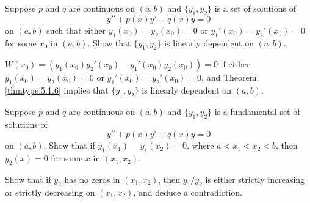 \documentclass{ximera}
\begin{document}
\begin{problem}\label{exer:5.1.30}
Suppose  $p$ and $q$ are continuous  on  $(a,b)$ and
$\{y_1,y_2\}$ is a  set of solutions of
$$
y''+p(x)y'+q(x)y=0
$$
on $(a,b)$ such that either $y_1(x_0)=y_2(x_0)=0$ or
$y_1'(x_0)=y_2'(x_0)=0$  for some $x_0$ in $(a,b)$. Show that
$\{y_1,y_2\}$ is linearly dependent on $(a,b)$.

\begin{solution}
    $W(x_0)=\left(y_1(x_0)y_2'(x_0)-y_1'(x_0)y_2(x_0)\right)=0$
if either $y_1(x_0)=y_2(x_0)=0$ or
$y_1'(x_0)=y_2'(x_0)=0$, and  Theorem \ref{thmtype:5.1.6}
implies that  $\{y_1,y_2\}$ is linearly dependent on  $(a,b)$.
\end{solution}
\end{problem}

\begin{problem}\label{exer:5.1.31}
Suppose  $p$ and $q$ are continuous  on  $(a,b)$ and
  $\{y_1,y_2\}$ is
a fundamental set of solutions of
$$
y''+p(x)y'+q(x)y=0
$$
on $(a,b)$. Show that if $y_1(x_1)=y_1(x_2)=0$, where $a<x_1<x_2<b$,
then $y_2(x)=0$ for some $x$ in $(x_1,x_2)$. 
\begin{hint}
    Show that
if $y_2$ has no zeros in $(x_1,x_2)$, then $y_1/y_2$ is either strictly
increasing or strictly decreasing on $(x_1,x_2)$, and deduce a
contradiction.
\end{hint}
\end{problem}
\end{document}
